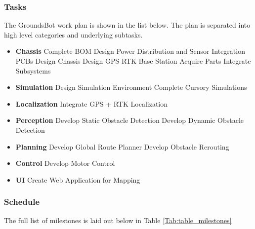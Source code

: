 \documentclass[12pt]{extarticle}
\begin{document}
\subsubsection{Tasks}
The GroundsBot work plan is shown in the list below. The plan is separated into high level categories and underlying subtasks. \\

\begin{itemize}
  \item [] \textbf{Chassis}
    \subitem Complete BOM
    \subitem Design Power Distribution and Sensor Integration PCBs %
    \subitem Design Chassis
    \subitem Design GPS RTK Base Station
    \subitem Acquire Parts
    \subitem Integrate Subsystems
  \item [] \textbf{Simulation}
    \subitem Design Simulation Environment
    \subitem Complete Cursory Simulations
  \item [] \textbf{Localization}
    \subitem Integrate GPS + RTK Localization
  \item [] \textbf{Perception}
    \subitem Develop Static Obstacle Detection
    \subitem Develop Dynamic Obstacle Detection
  \item [] \textbf{Planning}
    \subitem Develop Global Route Planner
    \subitem Develop Obstacle Rerouting
  \item [] \textbf{Control}
    \subitem Develop Motor Control
  \item [] \textbf{UI}
    \subitem Create Web Application for Mapping
\end{itemize}

   
\subsubsection{Schedule}
The full list of milestones is laid out below in Table \ref{Tab:table_milestones}\\ 
\end{document}
